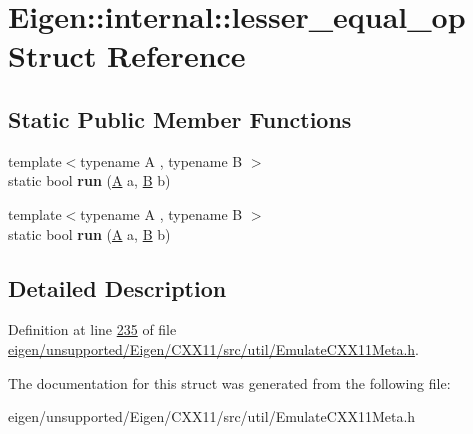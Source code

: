 \hypertarget{struct_eigen_1_1internal_1_1lesser__equal__op}{}\section{Eigen\+:\+:internal\+:\+:lesser\+\_\+equal\+\_\+op Struct Reference}
\label{struct_eigen_1_1internal_1_1lesser__equal__op}
\subsection*{Static Public Member Functions}
\begin{DoxyCompactItemize}
\item 
\mbox{\label{struct_eigen_1_1internal_1_1lesser__equal__op_ac72136d67c259ccd3536e61276910196}} 
{\footnotesize template$<$typename A , typename B $>$ }\\static bool {\bfseries run} (\hyperlink{group___core___module_class_eigen_1_1_matrix}{A} a, \hyperlink{group___core___module_class_eigen_1_1_matrix}{B} b)
\item 
\mbox{\label{struct_eigen_1_1internal_1_1lesser__equal__op_ac72136d67c259ccd3536e61276910196}} 
{\footnotesize template$<$typename A , typename B $>$ }\\static bool {\bfseries run} (\hyperlink{group___core___module_class_eigen_1_1_matrix}{A} a, \hyperlink{group___core___module_class_eigen_1_1_matrix}{B} b)
\end{DoxyCompactItemize}


\subsection{Detailed Description}


Definition at line \hyperlink{eigen_2unsupported_2_eigen_2_c_x_x11_2src_2util_2_emulate_c_x_x11_meta_8h_source_l00235}{235} of file \hyperlink{eigen_2unsupported_2_eigen_2_c_x_x11_2src_2util_2_emulate_c_x_x11_meta_8h_source}{eigen/unsupported/\+Eigen/\+C\+X\+X11/src/util/\+Emulate\+C\+X\+X11\+Meta.\+h}.



The documentation for this struct was generated from the following file\+:\begin{DoxyCompactItemize}
\item 
eigen/unsupported/\+Eigen/\+C\+X\+X11/src/util/\+Emulate\+C\+X\+X11\+Meta.\+h\end{DoxyCompactItemize}
